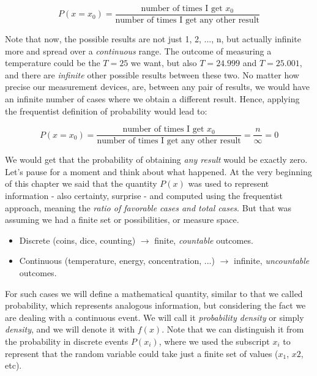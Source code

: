 \documentclass{book}
\begin{document}
\begin{equation}
P(x = x_{0}) = \frac{\text{number of times I get $x_{0}$}}{\text{number of times I get any other result}}
\end{equation}

Note that now, the possible results are not just 1, 2, ..., n, but actually infinite more and spread over a \textit{continuous} range. The outcome of measuring a temperature could be the $T = 25$ we want, but also $T = 24.999$ and $T = 25.001$, and there are \textit{infinite} other possible results between these two. No matter how precise our measurement devices, are, between any pair of results, we would have an infinite number of cases where we obtain a different result. Hence, applying the frequentist definition of probability would lead to:

\begin{equation}
P(x = x_{0}) = \frac{\text{number of times I get $x_{0}$}}{\text{number of times I get any other result}} = \frac{n}{\infty} = 0
\end{equation}

We would get that the probability of obtaining \textit{any result} would be exactly zero.\\

Let's pause for a moment and think about what happened. At the very beginning of this chapter we said that the quantity $P(x)$ was used to represent information - also certainty, surprise - and computed using the frequentist approach, meaning the \textit{ratio of favorable cases and total cases}. But that was assuming we had a finite set or possibilities, or measure space.

\begin{itemize}
\item Discrete (coins, dice, counting) $\longrightarrow$ finite, \textit{countable} outcomes.
\item Continuous (temperature, energy, concentration, ...) $\longrightarrow$ infinite, \textit{uncountable} outcomes.
\end{itemize}

For such cases we will define a mathematical quantity, similar to that we called probability, which represents analogous information, but considering the fact we are dealing with a continuous event. We will call it \textit{probability density} or simply \textit{density}, and we will denote it with $f(x)$. Note that we can distinguish it from the probability in discrete events $P(x_{i})$, where we used the subscript $x_{i}$ to represent that the random variable could take just a finite set of values ($x_{1}$, $x{2}$, etc).
\end{document}
